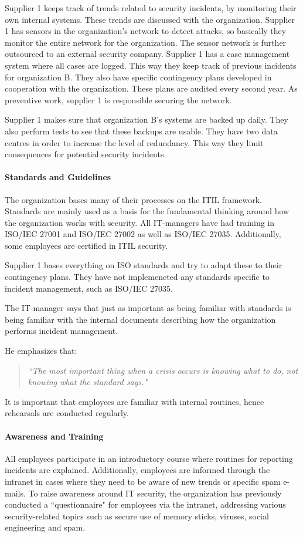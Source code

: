 Supplier 1 keeps track of trends related to security incidents, by monitoring their own internal systems. These trends are discussed with the organization. Supplier 1 has sensors in the organization's network to detect attacks, so basically they monitor the entire network for the organization. The sensor network is further outsourced to an external security company. Supplier 1 has a case management system where all cases are logged. This way they keep track of previous incidents for organization B. They also have specific contingency plans developed in cooperation with the organization. These plans are audited every second year. As preventive work, supplier 1 is responsible securing the network.

Supplier 1 makes sure that organization B's systems are backed up daily. They also perform tests to see that these backups are usable. They have two data centres in order to increase the level of redundancy. This way they limit consequences for potential security incidents.

\paragraph{Standards and Guidelines}
The organization bases many of their processes on the ITIL framework. Standards are mainly used as a basis for the fundamental thinking around how the organization works with security. All IT-managers have had training in ISO/IEC 27001 and ISO/IEC 27002 as well as ISO/IEC 27035. Additionally, some employees are certified in ITIL security. 

Supplier 1 bases everything on \acs{ISO} standards and try to adapt these to their contingency plans. They have not implemeneted any standards specific to incident management, such as \acs{ISO}/\acs{IEC} 27035. 

The IT-manager says that just as important as being familiar with standards is being familiar with the internal documents describing how the organization performs incident management. 

He emphasizes that:
\begin{quote}
\textit{``The most important thing when a crisis occurs is knowing what to do, not knowing what the standard says."}
\end{quote}
It is important that employees are familiar with internal routines, hence rehearsals are conducted regularly.

\paragraph{Awareness and Training}
All employees participate in an introductory course where routines for reporting incidents are explained. Additionally, employees are informed through the intranet in cases where they need to be aware of new trends or specific spam e-mails. To raise awareness around IT security, the organization has previously conducted a ``questionnaire" for employees via the intranet, addressing various security-related topics such as secure use of memory sticks, viruses, social engineering and spam. 

